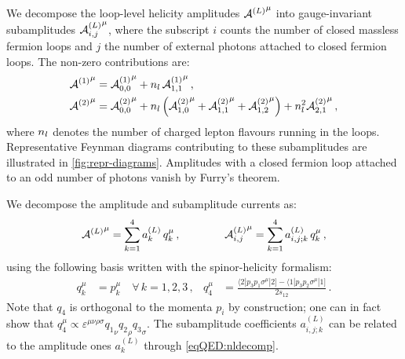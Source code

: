 \documentclass[main.tex]{subfiles}
\begin{document}
We decompose the loop-level helicity amplitudes ${\mathcal{A}^{(L)}}^{\mu}$ into gauge-invariant
subamplitudes ${\mathcal{A}^{(L)}_{i, j}}^{\mu}$, where the subscript $i$ counts the number of
closed massless fermion loops and $j$ the number of external photons attached
to closed fermion loops. The non-zero contributions are:
\begin{subequations}
    \label{eqQED:nldecomp}
    \begin{align}
        {\mathcal{A}^{(1)}}^{\mu} &= {\mathcal{A}^{(1)}_{0, 0}}^{\mu} + n_l \, {\mathcal{A}^{(1)}_{1, 1}}^{\mu} \,, \\*
        {\mathcal{A}^{(2)}}^{\mu} &= {\mathcal{A}^{(2)}_{0, 0}}^{\mu}
        + n_l \left( {\mathcal{A}^{(2)}_{1, 0}}^{\mu} + {\mathcal{A}^{(2)}_{1, 1}}^{\mu} + {\mathcal{A}^{(2)}_{1, 2}}^{\mu} \right)
        + n_l^2 {\mathcal{A}^{(2)}_{2, 1}}^{\mu} \,,
    \end{align}
\end{subequations}
where $n_l$ denotes the number of charged lepton flavours running in the loops.
Representative Feynman diagrams contributing to these subamplitudes are illustrated in \cref{fig:repr-diagrams}.
Amplitudes with a closed fermion loop attached to an odd number of photons vanish by Furry's theorem.

We decompose the amplitude and subamplitude currents as:
\begin{align}
    \label{eqQED:offshellproj}
    {\mathcal{A}^{(L)}}^{\mu} = \sum_{k=1}^4 a_{k}^{(L)} \, q_k^\mu \,, \qquad \qquad {\mathcal{A}^{(L)}_{i, j}}^{\mu} = \sum_{k=1}^4 a_{i,j;k}^{(L)} \, q_k^\mu \,,
\end{align}
using the following basis written with the spinor-helicity formalism:
\begin{align}
    \label{eqQED:proj-basis}
    q_k^\mu &= p_k^\mu \quad\forall \, k=1,2,3 \,, &
    q_4^\mu &= \frac{\langle 2|p_3p_1\sigma^\mu|2 ] - \langle 1|p_3p_2\sigma^\mu|1 ]}{2 s_{12}} \,.
\end{align}
Note that $q_4$ is orthogonal to the momenta $p_i$ by construction; one can in fact show that $q_4^\mu\propto \varepsilon^{\mu\nu\rho\sigma}{q_1}_\nu{q_2}_\rho{q_3}_\sigma$. 
The subamplitude coefficients $a_{i,j;k}^{(L)}$ can be related to the amplitude ones $a_{k}^{(L)}$ through \cref{eqQED:nldecomp}.
\end{document}
